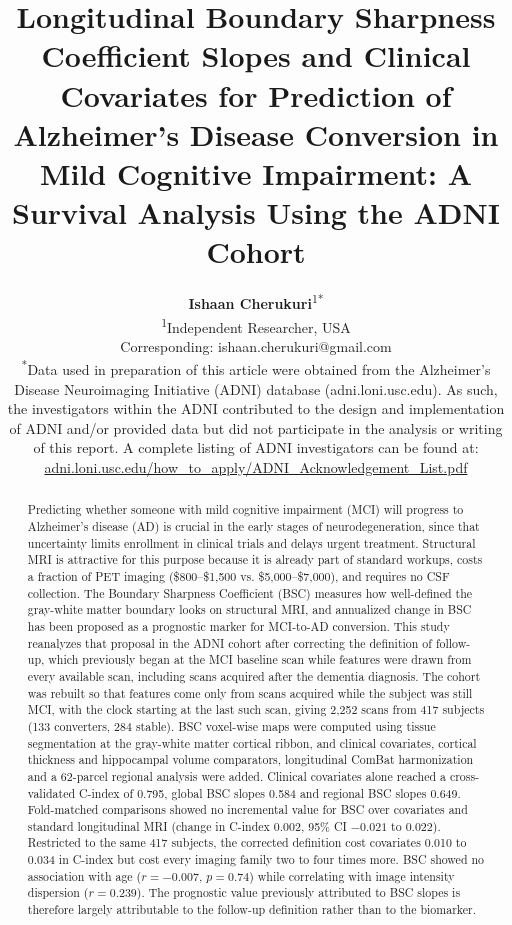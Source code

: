 \documentclass[blue]{ludusofficial}  %
\title{Longitudinal Boundary Sharpness Coefficient Slopes and Clinical Covariates for Prediction of Alzheimer's Disease Conversion in Mild Cognitive Impairment: A Survival Analysis Using the ADNI Cohort}
\author{%
    \textbf{Ishaan Cherukuri}\textsuperscript{1}\textsuperscript{*}\\[0.2cm]
    \small\textsuperscript{1}Independent Researcher, USA\\
    \small Corresponding: ishaan.cherukuri@gmail.com\\[0.4cm]
    \small\textsuperscript{*}Data used in preparation of this article were obtained from the Alzheimer's Disease Neuroimaging Initiative (ADNI) database (adni.loni.usc.edu). As such, the investigators within the ADNI contributed to the design and implementation of ADNI and/or provided data but did not participate in the analysis or writing of this report. A complete listing of ADNI investigators can be found at: \href{http://adni.loni.usc.edu/wp-content/uploads/how_to_apply/ADNI_Acknowledgement_List.pdf}{adni.loni.usc.edu/how\_to\_apply/ADNI\_Acknowledgement\_List.pdf}
}
\begin{document}
\begin{abstract}
Predicting whether someone with mild cognitive impairment (MCI) will progress to Alzheimer's disease (AD) is crucial in the early stages of neurodegeneration, since that uncertainty limits enrollment in clinical trials and delays urgent treatment. Structural MRI is attractive for this purpose because it is already part of standard workups, costs a fraction of PET imaging (\$800--\$1,500 vs. \$5,000--\$7,000), and requires no CSF collection. The Boundary Sharpness Coefficient (BSC)\cite{olafson2021bsc} measures how well-defined the gray-white matter boundary looks on structural MRI, and annualized change in BSC has been proposed as a prognostic marker for MCI-to-AD conversion. This study reanalyzes that proposal in the ADNI cohort after correcting the definition of follow-up, which previously began at the MCI baseline scan while features were drawn from every available scan, including scans acquired after the dementia diagnosis. The cohort was rebuilt so that features come only from scans acquired while the subject was still MCI, with the clock starting at the last such scan, giving 2,252 scans from 417 subjects (133 converters, 284 stable). BSC voxel-wise maps were computed using tissue segmentation at the gray-white matter cortical ribbon, and clinical covariates, cortical thickness and hippocampal volume comparators, longitudinal ComBat harmonization and a 62-parcel regional analysis were added. Clinical covariates alone reached a cross-validated C-index of 0.795, global BSC slopes 0.584 and regional BSC slopes 0.649. Fold-matched comparisons showed no incremental value for BSC over covariates and standard longitudinal MRI (change in C-index 0.002, 95\% CI $-0.021$ to $0.022$). Restricted to the same 417 subjects, the corrected definition cost covariates 0.010 to 0.034 in C-index but cost every imaging family two to four times more. BSC showed no association with age ($r=-0.007$, $p=0.74$) while correlating with image intensity dispersion ($r=0.239$). The prognostic value previously attributed to BSC slopes is therefore largely attributable to the follow-up definition rather than to the biomarker.
\end{abstract}


\end{document}
